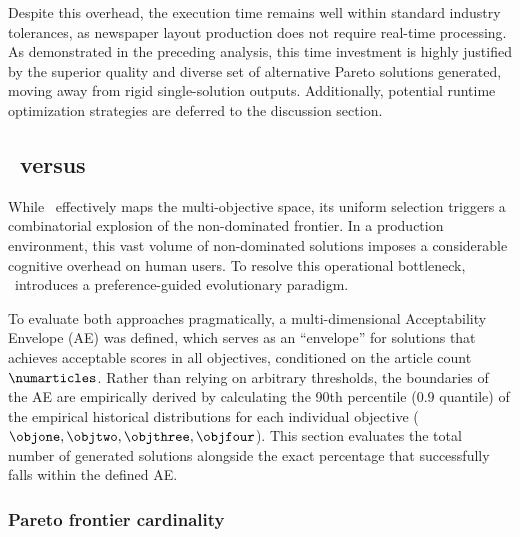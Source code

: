 \begin{table}[htbp]
\caption{Computational runtime performance across different \numarticles\ strata.}
\label{tab:exec_time_analysis}
\end{table}

Despite this overhead, the execution time remains well within standard industry tolerances, as newspaper layout production does not require real-time processing. As demonstrated in the preceding analysis, this time investment is highly justified by the superior quality and diverse set of alternative Pareto solutions generated, moving away from rigid single-solution outputs. Additionally, potential runtime optimization strategies are deferred to the discussion section.

\subsection{\methodName\ versus \methodNameUniform}
\label{sec:rnsga-vs-nsga}


While \methodNameUniform\ effectively maps the multi-objective space, its uniform selection triggers a combinatorial explosion of the non-dominated frontier. In a production environment, this vast volume of non-dominated solutions imposes a considerable cognitive overhead on human users. To resolve this operational bottleneck, \methodName\ introduces a preference-guided evolutionary paradigm. 

To evaluate both approaches pragmatically, a multi-dimensional Acceptability Envelope (AE) was defined, which serves as an ``envelope'' for solutions that achieves acceptable scores in all objectives, conditioned on the article count $\numarticles$. Rather than relying on arbitrary thresholds, the boundaries of the AE are empirically derived by calculating the 90th percentile ($0.9$ quantile) of the empirical historical distributions for each individual objective ($\objone, \objtwo, \objthree, \objfour$). This section evaluates the total number of generated solutions alongside the exact percentage that successfully falls within the defined AE.


\subsubsection{Pareto frontier cardinality}

